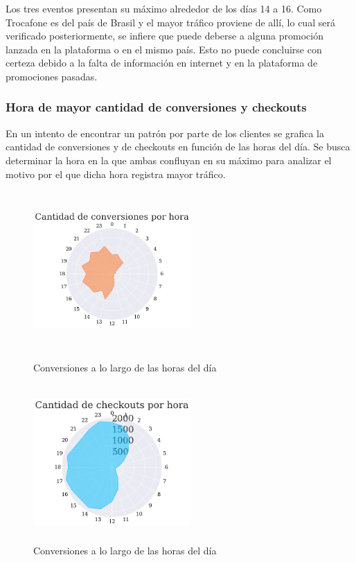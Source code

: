 \documentclass[a4paper]{article}
\begin{document}
Los tres eventos presentan su máximo alrededor de los días 14 a 16. Como Trocafone es del país de Brasil y el mayor tráfico proviene de allí, lo cual será verificado posteriormente, se infiere que puede deberse a alguna promoción lanzada en la plataforma o en el mismo país. Esto no puede concluirse con certeza debido a la falta de información en internet y en la plataforma de promociones pasadas.

\subsubsection{Hora de mayor cantidad de conversiones y checkouts}

En un intento de encontrar un patrón por parte de los clientes se grafica la cantidad de conversiones y de checkouts en función de las horas del día. Se busca determinar la hora en la que ambas confluyan en su máximo para analizar el motivo por el que dicha hora registra mayor tráfico.

\begin{figure}[h!]
	\centering
	\begin{minipage}[b]{0.4\textwidth}
		\includegraphics[width=6cm,height=6cm,keepaspectratio]{figures/040-hours-conversion-radarchart.png}
		\caption{Conversiones a lo largo de las horas del día}
	\end{minipage}
	\hfill
	\begin{minipage}[b]{0.4\textwidth}
		\includegraphics[width=6cm,height=6cm,keepaspectratio]{figures/041-hours-checkout-radarchart.png}
		\caption{Conversiones a lo largo de las horas del día}
	\end{minipage}
\end{figure}
\end{document}
